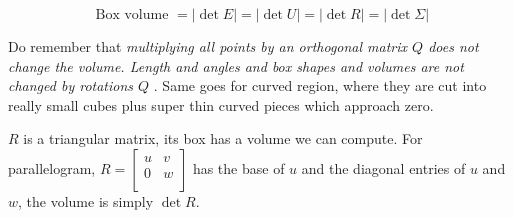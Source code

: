 \[
  \text{ Box volume } = \vert \det E \vert = \vert \det U \vert = \vert \det R \vert = \vert \det \Sigma  \vert   
\]

Do remember that \emph{multiplying all points by an orthogonal matrix \(Q\) does not change the volume.  Length and angles and box shapes and volumes are not changed by rotations \(Q\) }. Same goes for curved region, where they are cut into really small cubes plus super thin curved pieces which approach zero. 

\(R\) is a triangular matrix, its box has a volume we can compute. For parallelogram, \(R = \begin{bmatrix}
  u & v  \\
  0 & w  \\
\end{bmatrix}\)  has the base of \(u\) and the diagonal entries of \(u\) and \(w\), the volume is simply \(\det R\).    